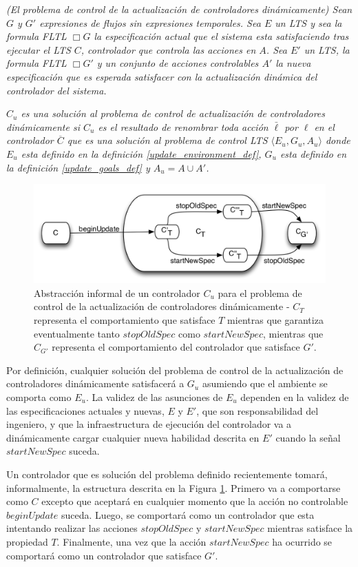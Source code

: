 \begin{nahaDef}
\emph{(El problema de control de la actualización de controladores dinámicamente) Sean $G$ y $G'$ expresiones de flujos
sin expresiones temporales. Sea $E$ un LTS y sea la formula FLTL $\Box G$ la especificación actual que el sistema esta
satisfaciendo tras ejecutar el LTS $C$, controlador que controla las acciones en $A$. Sea $E'$ un LTS, la formula FLTL
$\Box G'$ y un conjunto de acciones controlables $A'$ la nueva especificación que es esperada satisfacer con la
actualización dinámica del controlador del sistema.}

\emph{$C_u$ es una solución al problema de control de actualización de controladores dinámicamente si $C_u$ es el resultado de
renombrar toda acción $\bar{\ell}$ por $\ell$ en el controlador $\overline{C}$ que es una solución al problema de
control LTS $\langle E_u, G_u, A_u \rangle$ donde $E_u$ esta definido en la definición \ref{update_environment_def},
$G_u$ esta definido en la definición \ref{update_goals_def} y $A_u = A \cup A'$.}
\end{nahaDef}

\begin{figure}
\centering
\includegraphics[scale=0.35]{img/C_u.png}
\caption{Abstracción informal de un controlador $C_u$ para el problema de control de la actualización de controladores
dinámicamente - $C_T$ representa el comportamiento que satisface $T$ mientras que garantiza eventualmente tanto
$stopOldSpec$ como $startNewSpec$, mientras que $C_{G'}$ representa el comportamiento del controlador que satisface
$G'$.}
\label{update_controller}
\end{figure}

Por definición, cualquier solución del problema de control de la actualización de controladores dinámicamente
satisfacerá a $G_u$ asumiendo que el ambiente se comporta como $E_u$. La validez de las asunciones de $E_u$ dependen en
la validez de las especificaciones actuales y nuevas, $E$ y $E'$, que son responsabilidad del ingeniero, y que la
infraestructura de ejecución del controlador va a dinámicamente cargar cualquier nueva habilidad descrita en $E'$ cuando
la señal $startNewSpec$ suceda.

Un controlador que es solución del problema definido recientemente tomará, informalmente, la estructura descrita en la
Figura \ref{update_controller}. Primero va a comportarse como $C$ excepto que aceptará en cualquier momento que la acción no controlable
$beginUpdate$ suceda. Luego, se comportará como un controlador que esta intentando realizar las acciones $stopOldSpec$ y
$startNewSpec$ mientras satisface la propiedad $T$. Finalmente, una vez que la acción $startNewSpec$ ha ocurrido se
comportará como un controlador que satisface $G'$.


